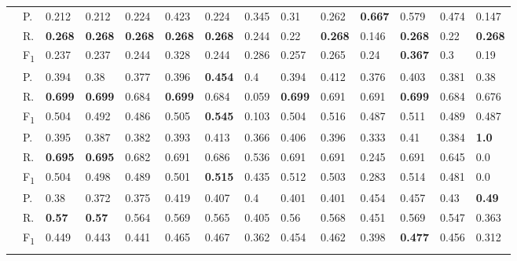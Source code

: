 \begin{tabularx}{\hsize}{p{1.3em}l Z  Z  Z  Z  Z  Z  Z  Z  Z  Z  Z  Z }
    & P.    & 0.212    & 0.212    & 0.224    & 0.423    & 0.224    & 0.345    & 0.31    & 0.262    & \textbf{ 0.667 }    & 0.579    & 0.474    & 0.147 \\
    & R.    & \textbf{ 0.268 }    & \textbf{ 0.268 }    & \textbf{ 0.268 }    & \textbf{ 0.268 }    & \textbf{ 0.268 }    & 0.244    & 0.22    & \textbf{ 0.268 }    & 0.146    & \textbf{ 0.268 }    & 0.22    & \textbf{ 0.268 } \\
    & F\textsubscript{1}    & 0.237    & 0.237    & 0.244    & 0.328    & 0.244    & 0.286    & 0.257    & 0.265    & 0.24    & \textbf{ 0.367 }    & 0.3    & 0.19 \\
     \midrule {}

    & P.    & 0.394    & 0.38    & 0.377    & 0.396    & \textbf{ 0.454 }    & 0.4    & 0.394    & 0.412    & 0.376    & 0.403    & 0.381    & 0.38 \\
    & R.    & \textbf{ 0.699 }    & \textbf{ 0.699 }    & 0.684    & \textbf{ 0.699 }    & 0.684    & 0.059    & \textbf{ 0.699 }    & 0.691    & 0.691    & \textbf{ 0.699 }    & 0.684    & 0.676 \\
    & F\textsubscript{1}    & 0.504    & 0.492    & 0.486    & 0.505    & \textbf{ 0.545 }    & 0.103    & 0.504    & 0.516    & 0.487    & 0.511    & 0.489    & 0.487 \\
     \midrule {}

    & P.    & 0.395    & 0.387    & 0.382    & 0.393    & 0.413    & 0.366    & 0.406    & 0.396    & 0.333    & 0.41    & 0.384    & \textbf{ 1.0 } \\
    & R.    & \textbf{ 0.695 }    & \textbf{ 0.695 }    & 0.682    & 0.691    & 0.686    & 0.536    & 0.691    & 0.691    & 0.245    & 0.691    & 0.645    & 0.0 \\
    & F\textsubscript{1}    & 0.504    & 0.498    & 0.489    & 0.501    & \textbf{ 0.515 }    & 0.435    & 0.512    & 0.503    & 0.283    & 0.514    & 0.481    & 0.0 \\
     \midrule {}

    & P.    & 0.38    & 0.372    & 0.375    & 0.419    & 0.407    & 0.4    & 0.401    & 0.401    & 0.454    & 0.457    & 0.43    & \textbf{ 0.49 } \\
    & R.    & \textbf{ 0.57 }    & \textbf{ 0.57 }    & 0.564    & 0.569    & 0.565    & 0.405    & 0.56    & 0.568    & 0.451    & 0.569    & 0.547    & 0.363 \\
    & F\textsubscript{1}    & 0.449    & 0.443    & 0.441    & 0.465    & 0.467    & 0.362    & 0.454    & 0.462    & 0.398    & \textbf{ 0.477 }    & 0.456    & 0.312 \\
     \midrule {}


\end{tabularx}
